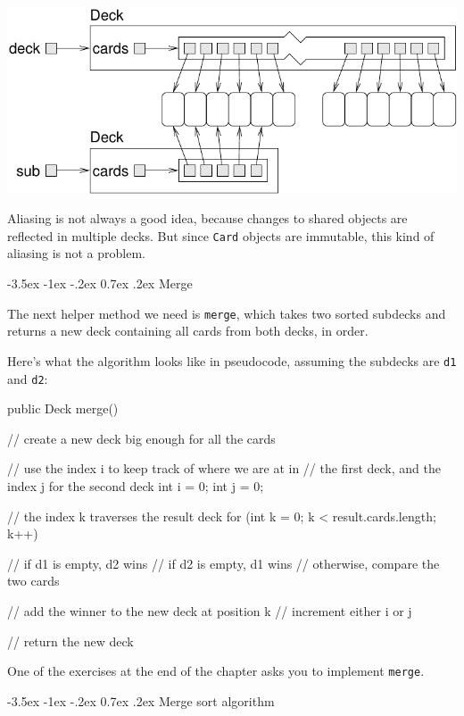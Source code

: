 \documentclass[12pt]{book}
\makeatletter
\theoremstyle{exercise}
\newcommand{\java}[1]{\verb"#1"}
\renewcommand{\section}{\@startsection{section}{1}{\z@}%
    {-3.5ex \@plus -1ex \@minus -.2ex}%
    {0.7ex \@plus.2ex}%
    {\normalfont\Large\bfseries}}
\newcommand{\java}[1]{\lstinline{#1}} %
\makeatother
\begin{document}
\begin{center}
\includegraphics{figs/subdeck.pdf}
\end{center}


Aliasing is not always a good idea, because changes to shared objects are reflected in multiple decks.
But since \java{Card} objects are immutable, this kind of aliasing is not a problem.


\section{Merge}

The next helper method we need is \java{merge}, which takes two sorted subdecks and returns a new deck containing all cards from both decks, in order.

Here's what the algorithm looks like in pseudocode, assuming the subdecks are \java{d1} and \java{d2}:

\begin{code}
public Deck merge() {
    // create a new deck big enough for all the cards

    // use the index i to keep track of where we are at in
    // the first deck, and the index j for the second deck
    int i = 0;
    int j = 0;

    // the index k traverses the result deck
    for (int k = 0; k < result.cards.length; k++) {

        // if d1 is empty, d2 wins
        // if d2 is empty, d1 wins
        // otherwise, compare the two cards

        // add the winner to the new deck at position k
        // increment either i or j
    }
    // return the new deck
}
\end{code}

One of the exercises at the end of the chapter asks you to implement \java{merge}.


\section{Merge sort algorithm}
\end{document}
